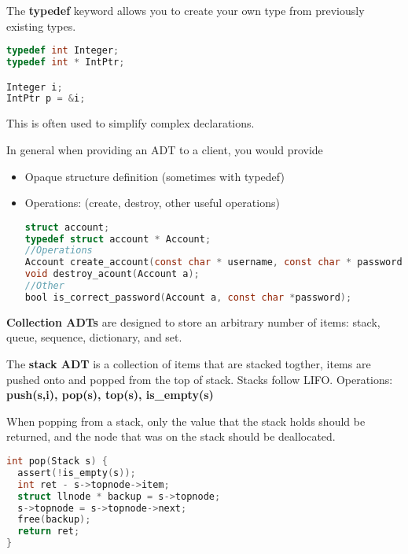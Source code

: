 \documentclass[english, 12pt]{article}
\begin{document}
\begin{defn}
The \textbf{typedef} keyword allows you to create your own type from previously existing types.
\begin{lstlisting}[language=C]
typedef int Integer;
typedef int * IntPtr;

Integer i;
IntPtr p = &i;
\end{lstlisting}
This is often used to simplify complex declarations.
\end{defn}

\begin{exmp}
In general when providing an ADT to a client, you would provide
\begin{itemize}
\item Opaque structure definition (sometimes with typedef)
\item Operations: (create, destroy, other useful operations)
\begin{lstlisting}[language=C]
struct account;
typedef struct account * Account;
//Operations
Account create_account(const char * username, const char * password);
void destroy_acount(Account a);
//Other
bool is_correct_password(Account a, const char *password);
\end{lstlisting}
\end{itemize}
\end{exmp}

\begin{defn}
\textbf{Collection ADTs} are designed to store an arbitrary number of items: stack, queue, sequence, dictionary, and set.
\end{defn}

\begin{defn}
The \textbf{stack ADT} is a collection of items that are stacked togther, items are pushed onto and popped from the top of stack. Stacks follow LIFO.\n
Operations: \textbf{push(s,i), pop(s), top(s), is\_empty(s)}
\end{defn}

\begin{note}
When popping from a stack, only the value that the stack holds should be returned, and the node that was on the stack should be deallocated.
\begin{lstlisting}[language=C]
int pop(Stack s) {
  assert(!is_empty(s));
  int ret - s->topnode->item;
  struct llnode * backup = s->topnode;
  s->topnode = s->topnode->next;
  free(backup);
  return ret;
}
\end{lstlisting}
\end{note}
\end{document}

